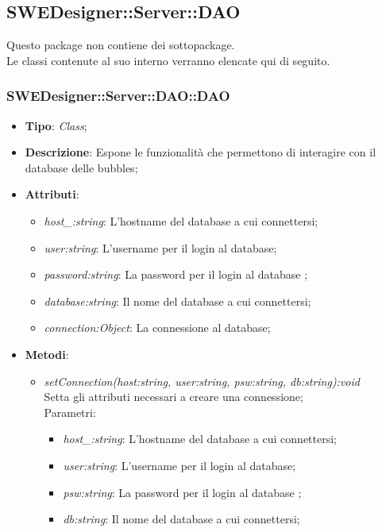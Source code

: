 \documentclass[../DefinizioneDiProdotto.tex]{subfiles}
\begin{document}
			
			\subsection{SWEDesigner::Server::DAO}
			Questo package non contiene dei sottopackage.\\
			Le classi contenute al suo interno verranno elencate qui di seguito.
			\subsubsection{SWEDesigner::Server::DAO::DAO}
			\hypertarget{SWEDesigner::Server::DAO::DAO}{}
			\begin{itemize}
				\item \textbf{Tipo}: \emph{Class};
				\item \textbf{Descrizione}: Espone le funzionalità che permettono di interagire con il database delle bubbles; \\
				\item \textbf{Attributi}:
				\begin{itemize}
					\item \emph{host\_:string}: L'hostname del database a cui connettersi;
					\item \emph{user:string}: L'username per il login al database;
					\item \emph{password:string}: La password per il login al database ;
					\item \emph{database:string}: Il nome del database a cui connettersi;
					\item \emph{connection:Object}: La connessione al database;
				\end{itemize}
				\item \textbf{Metodi}:
				\begin{itemize}
					\item \emph{setConnection(host:string, user:string, psw:string, db:string):void} \\ 
					Setta gli attributi necessari a creare una connessione; \\
					Parametri:
					\begin{itemize}
						\item \emph{host\_:string}: L'hostname del database a cui connettersi;
						\item \emph{user:string}: L'username per il login al database;
						\item \emph{psw:string}: La password per il login al database ;
						\item \emph{db:string}: Il nome del database a cui connettersi;
					\end{itemize}
					

\end{itemize}
\end{itemize}
\end{document}

